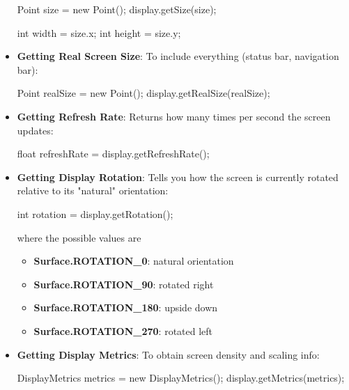 \documentclass{report}
\begin{document}
\begin{itemize}
\begin{javacode}
                Point size = new Point();
                display.getSize(size);

                int width = size.x;
                int height = size.y;
            \end{javacode}
        \item \textbf{Getting Real Screen Size}: To include everything (status bar, navigation bar):
            \bigbreak \noindent 
            \begin{javacode}
                Point realSize = new Point();
                display.getRealSize(realSize);
            \end{javacode}
        \item \textbf{Getting Refresh Rate}: Returns how many times per second the screen updates:
            \bigbreak \noindent 
            \begin{javacode}
                float refreshRate = display.getRefreshRate();
            \end{javacode}
        \item \textbf{Getting Display Rotation}: Tells you how the screen is currently rotated relative to its "natural" orientation:
            \bigbreak \noindent 
            \begin{javacode}
            int rotation = display.getRotation();
            \end{javacode}
            \bigbreak \noindent 
            where the possible values are
            \begin{itemize}
                \item \textbf{Surface.ROTATION\_0}:  natural orientation
                \item \textbf{Surface.ROTATION\_90}:  rotated right
                \item \textbf{Surface.ROTATION\_180}:  upside down
                \item \textbf{Surface.ROTATION\_270}:  rotated left
            \end{itemize}
        \item \textbf{Getting Display Metrics}: To obtain screen density and scaling info:
            \bigbreak \noindent 
            \begin{javacode}
                DisplayMetrics metrics = new DisplayMetrics();
                display.getMetrics(metrics);


\end{javacode}
\end{itemize}
\end{document}
